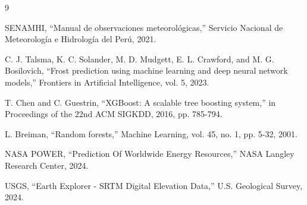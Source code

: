 \documentclass[11pt, a4paper]{article}
\begin{document}
\begin{thebibliography}{9}

SENAMHI, ``Manual de observaciones meteorológicas,'' Servicio Nacional de Meteorología e Hidrología del Perú, 2021.

C. J. Talsma, K. C. Solander, M. D. Mudgett, E. L. Crawford, and M. G. Bosilovich, ``Frost prediction using machine learning and deep neural network models,'' Frontiers in Artificial Intelligence, vol. 5, 2023.

T. Chen and C. Guestrin, ``XGBoost: A scalable tree boosting system,'' in Proceedings of the 22nd ACM SIGKDD, 2016, pp. 785-794.

L. Breiman, ``Random forests,'' Machine Learning, vol. 45, no. 1, pp. 5-32, 2001.

NASA POWER, ``Prediction Of Worldwide Energy Resources,'' NASA Langley Research Center, 2024.

USGS, ``Earth Explorer - SRTM Digital Elevation Data,'' U.S. Geological Survey, 2024.

\end{thebibliography}
\end{document}
